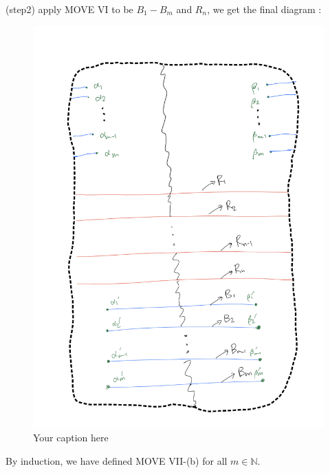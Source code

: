 (step2) apply MOVE \RN{6} to be $B_1 - B_m$ and $R_n$, we get the final diagram :
\begin{figure}[H] %
    \centering
    \includegraphics[width=\linewidth]{diagrams/definition7/8.png} %
    \caption{Your caption here}
    \label{fig:your-label}
\end{figure}

By induction, we have defined MOVE \RN{7}-(b) for all $m\in \mathbb{N}$.